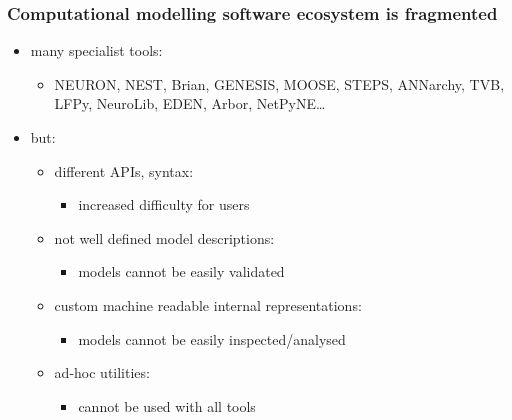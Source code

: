 \begin{frame}[c]
  \frametitle{Computational modelling software ecosystem is fragmented}
  \begin{itemize}
    \item many specialist tools:
      \begin{itemize}
        \item NEURON, NEST, Brian, GENESIS, MOOSE, STEPS, ANNarchy, TVB, LFPy, NeuroLib, EDEN, Arbor, NetPyNE\ldots{}
      \end{itemize}
    \item<2-> \alert{but:}
      \begin{itemize}
        \item<2-> different APIs, syntax:
          \begin{itemize}
            \item<2-> increased difficulty for users
          \end{itemize}
        \item<3-> not well defined model descriptions:
          \begin{itemize}
            \item<3-> models cannot be easily validated
          \end{itemize}
        \item<4-> custom machine readable internal representations:
          \begin{itemize}
            \item<4-> models cannot be easily inspected/analysed
          \end{itemize}
        \item<5-> ad-hoc utilities:
          \begin{itemize}
            \item<5->  cannot be used with all tools
          \end{itemize}
      \end{itemize}
  \end{itemize}
\end{frame}
